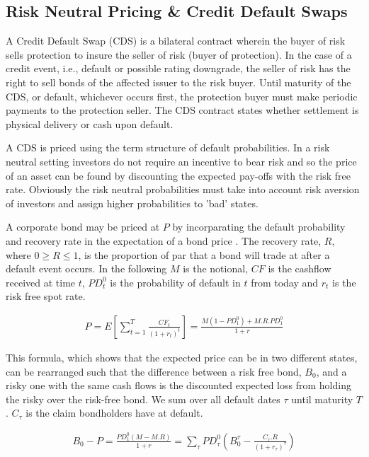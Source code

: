 \subsection{Risk Neutral Pricing \& Credit Default Swaps}\label{subsec:rnpricing}

A Credit Default Swap (CDS) is a bilateral contract wherein the buyer of risk sells protection to insure the seller of risk (buyer of protection).  In the case of a credit event, i.e., default or possible rating downgrade, the seller of risk has the right to sell bonds of the affected issuer to the risk buyer.  Until maturity of the CDS, or default, whichever occurs first, the protection buyer must make periodic payments to the protection seller.  The CDS contract states whether settlement is physical delivery or cash upon default.

A CDS is priced using the term structure of default probabilities. In a risk neutral setting investors do not require an incentive to bear risk and so the price of an asset can be found by discounting the expected pay-offs with the risk free rate. Obviously the risk neutral probabilities must take into account risk aversion of investors and assign higher probabilities to 'bad' states.

A corporate bond may be priced at $P$ by incorparating the default probability and recovery rate in the expectation of a bond price \cite{lp2007}.  The recovery rate, $R$, where $0 \geq R \leq 1$, is the proportion of par that a bond will trade at after a default event occurs. In the following $M$ is the notional, $CF$ is the cashflow received at time $t$, $PD^0_t$ is the probability of default in $t$ from today and $r_t$ is the risk free spot rate.


\begin{align}
 P = E \left[ \sum^T_{t = 1} \frac{CF_t}{(1+r_t)^t} \right] = \frac{M (1 - PD^0_1) + M.R.PD^0_1}{1+r} \nonumber
\end{align}

This formula, which shows that the expected price can be in two different states, can be rearranged such that the difference between a risk free bond, $B_0$, and a risky one with the same cash flows is the discounted expected loss from holding the risky over the risk-free bond.
We sum over all default dates $\tau$ until maturity $T$. $C_\tau$ is the claim bondholders have at default.

\begin{align}
 B_0 - P = \frac{PD^0_1(M - M.R)}{1+r} = \sum_\tau PD^0_\tau \left( B^\tau_0 - \frac{C_\tau. R }{(1 + r_\tau)^\tau } \right) \nonumber
\end{align} 

